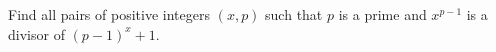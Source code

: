 Find all pairs of positive integers $(x,p)$
such that $p$ is a prime and $x^{p-1}$ is a divisor of $ (p-1)^{x}+1$.